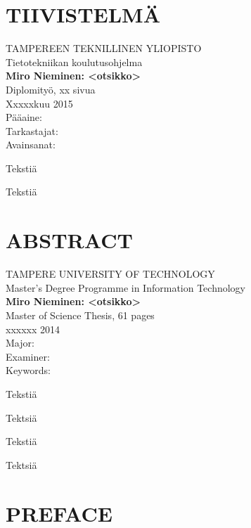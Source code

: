 \newpage
 
\setcounter{page}{1} %
 
\chapter*{TIIVISTELMÄ}
\begin{spacing}{1.0}
\textsf{TAMPEREEN TEKNILLINEN YLIOPISTO}\\
\textsf{Tietotekniikan koulutusohjelma}\\
{\bf \textsf{Miro Nieminen: <otsikko>}}\\
\textsf{Diplomityö, xx sivua}\\
\textsf{Xxxxxkuu 2015}\\
\textsf{Pääaine: }\\
\textsf{Tarkastajat: }\\
\textsf{Avainsanat: }\\
\end{spacing}
 
\noindent
Tekstiä
 
\noindent
Tekstiä

\newpage
\chapter*{ABSTRACT}
\begin{spacing}{1.0}
\textsf{TAMPERE UNIVERSITY OF TECHNOLOGY}\\
\textsf{Master's Degree Programme in Information Technology}\\
{\bf \textsf{Miro Nieminen: <otsikko>}}\\
\textsf{Master of Science Thesis, 61 pages}\\
\textsf{xxxxxx 2014}\\
\textsf{Major: }\\
\textsf{Examiner: }\\
\textsf{Keywords: }\\
\end{spacing}
 
\noindent
Tekstiä
 
\noindent
Tektsiä

\noindent
Tekstiä

\noindent
Tektsiä

\newpage
 
\chapter*{PREFACE}
\noindent 

